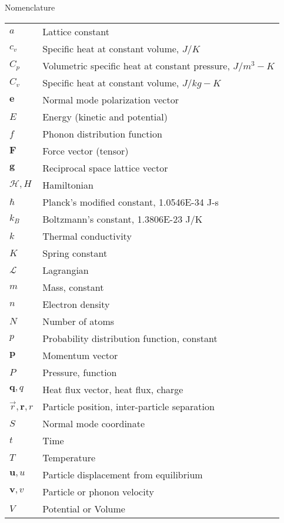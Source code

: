 
Nomenclature\\
\begin{center}
\begin{longtable}{ l l }
$a$ & Lattice constant \\
$c_v$ & Specific heat at constant volume, $J/K$\\
$C_p$ & Volumetric specific heat at constant pressure, $J/m^3-K$\\
$C_v$ & Specific heat at constant volume, $J/kg-K$\\
$\textbf{e}$ & Normal mode polarization vector\\
$E$ & Energy (kinetic and potential)\\
$f$ & Phonon distribution function\\
$\textbf{F}$ & Force vector (tensor)\\
$\textbf{g}$ & Reciprocal space lattice vector\\
$\mathscr{H}, H$ & Hamiltonian \\
$\hbar$ & Planck's modified constant, 1.0546E-34 J-s\\
$k_B$ & Boltzmann's constant, 1.3806E-23 J/K\\
$k$ & Thermal conductivity\\
$K$ & Spring constant\\
$\mathscr{L}$ & Lagrangian \\
$m$ & Mass, constant\\
$n$ & Electron density\\
$N$ & Number of atoms\\
$p$ & Probability distribution function, constant\\
$\textbf{p}$ & Momentum vector\\
$P$ & Pressure, function\\
$\textbf{q},q$ & Heat flux vector, heat flux, charge\\
$\vec{r},\textbf{r},r$ & Particle position, inter-particle separation\\
$S$ & Normal mode coordinate\\
$t$ & Time\\
$T$ & Temperature\\
$\textbf{u},u$ & Particle displacement from equilibrium\\
$\textbf{v},v$ & Particle or phonon velocity\\
$V$ & Potential or Volume\\
\end{longtable}
\end{center}

